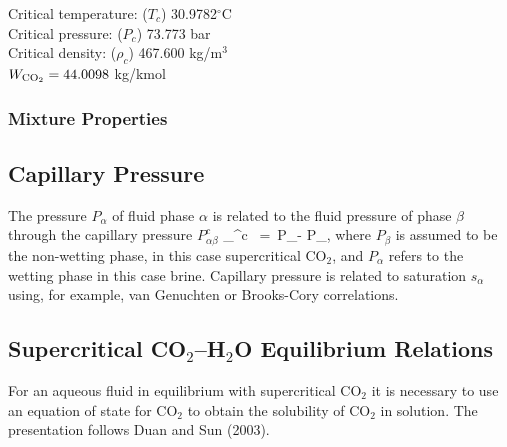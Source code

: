 \documentclass[12pt]{article}
\def\EQ#1\EN{\begin{equation}#1\end{equation}}
\newcommand{\eq}{\ =\ }
\newcommand{\degc}{$^\circ$C}
\renewcommand{\c}{{\rm CO_2}}
\renewcommand{\a}{{\alpha}}
\renewcommand{\b}{{\beta}}
\begin{document}
\noindent
Critical temperature: ($T_c$) 30.9782\degc\\
Critical pressure: ($P_c$)	73.773 bar\\
Critical density: ($\rho_c$)	467.600 kg/m$^3$\\
$W_{\c} = 44.0098$ kg/kmol

\subsubsection{Mixture Properties}

\subsection{Capillary Pressure}

The pressure $P_\a$ of fluid phase $\a$ is related to the fluid pressure of phase $\b$ through the capillary pressure $P_{\a\b}^c$
\EQ
P_{\a\b}^c \eq P_\b - P_\a,
\EN
where $P_\b$ is assumed to be the non-wetting phase, in this case supercritical CO$_2$, and $P_\a$ refers to the wetting phase in this case brine. Capillary pressure is related to saturation $s_\a$ using, for example, van Genuchten or Brooks-Cory correlations.

\subsection{Supercritical CO$_2$--H$_2$O Equilibrium Relations}
\label{sec:eqrel}

For an aqueous fluid in equilibrium with supercritical CO$_2$ it is necessary to use an equation of state for CO$_2$ to obtain the solubility of CO$_2$ in solution. The presentation follows Duan and Sun (2003). 
\end{document}
